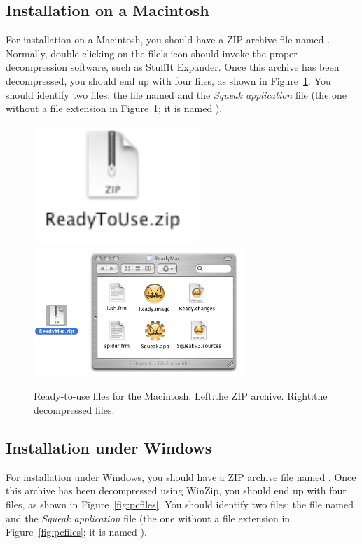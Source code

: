 \documentclass[a4paper,10pt,twoside]{book}
\begin{document}
\subsection{Installation on a Macintosh}

For installation on a Macintosh, you should have a ZIP archive file named . 
Normally, double clicking on the file’s icon should invoke the proper decompression software, 
such as StuffIt Expander. Once this archive has been decompressed, you should end up with 
four files, as shown in Figure~\ref{fig:macfiles}. You should identify two files: the file named  
and the \emph{Squeak application} file (the one without a file extension in Figure~\ref{fig:macfiles}; it is named 
\Squeak). 

\begin{figure}[h]\centerline{\includegraphics{1-ReadyToUseMacZip2}\includegraphics[width=8cm]{2-macFiles2}}
\caption{Ready-to-use files for the Macintosh. Left:the ZIP archive. Right:the decompressed files.\label{fig:macfiles}}\end{figure}

\subsection{Installation under Windows}

For installation under Windows, you should have a ZIP archive file named . 
Once this archive has been decompressed using WinZip, you should end up with four files, as 
shown in Figure~\ref{fig:pcfiles}. You should identify two files: the file named  and the \emph{Squeak application} 
file (the one without a file extension in Figure~\ref{fig:pcfiles}; it is named \Squeak). 
\end{document}
